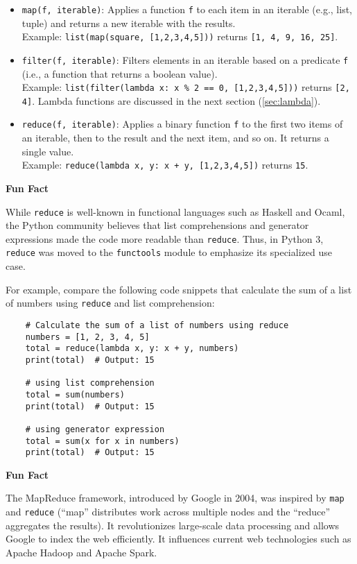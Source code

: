 \documentclass[oneside,11pt,dvipsnames]{book}
\newenvironment{historybox}[1][]{
  \small
  \begin{myhistorybox}
    {\small \textbf{#1}}
  }{
  \end{myhistorybox}
}
\newcommand{\code}[1]{\texttt{#1}}
\begin{document}
\begin{itemize}
    \item \code{map(f, iterable)}: Applies a function \code{f} to each item in an iterable (e.g., list, tuple) and returns a new iterable with the results.\\
    Example: \code{list(map(square, [1,2,3,4,5]))} returns \code{[1, 4, 9, 16, 25]}.
    \item \code{filter(f, iterable)}: Filters elements in an iterable based on a predicate \code{f} (i.e., a function that returns a boolean value).\\
    Example: \code{list(filter(lambda x: x \% 2 == 0, [1,2,3,4,5]))} returns \code{[2, 4]}. Lambda functions are discussed in the next section (\autoref{sec:lambda}).
    \item \code{reduce(f, iterable)}: Applies a binary function \code{f} to the first two items of an iterable, then to the result and the next item, and so on. It returns a single value.\\
    Example: \code{reduce(lambda x, y: x + y, [1,2,3,4,5])} returns \code{15}. 
\end{itemize}

\begin{historybox}[Fun Fact] 
    While \code{reduce} is well-known in functional languages such as Haskell and Ocaml, the Python community believes that list comprehensions and generator expressions made the code more readable than \code{reduce}. Thus, in Python 3, \code{reduce} was moved to the \code{functools} module to emphasize its specialized use case.

    For example, compare the following code snippets that calculate the sum of a list of numbers using \code{reduce} and list comprehension:
    \begin{lstlisting}
    # Calculate the sum of a list of numbers using reduce
    numbers = [1, 2, 3, 4, 5]
    total = reduce(lambda x, y: x + y, numbers)
    print(total)  # Output: 15
    
    # using list comprehension
    total = sum(numbers)
    print(total)  # Output: 15
    
    # using generator expression
    total = sum(x for x in numbers)
    print(total)  # Output: 15
    \end{lstlisting}    
\end{historybox}


\begin{historybox}[Fun Fact]
The MapReduce framework, introduced by Google in 2004, was inspired by \code{map} and \code{reduce} (``map'' distributes work across multiple nodes and the ``reduce'' aggregates the results).  It revolutionizes large-scale data processing and allows Google to index the web efficiently. It influences current web technologies such as Apache Hadoop and Apache Spark.
\end{historybox}
\end{document}

